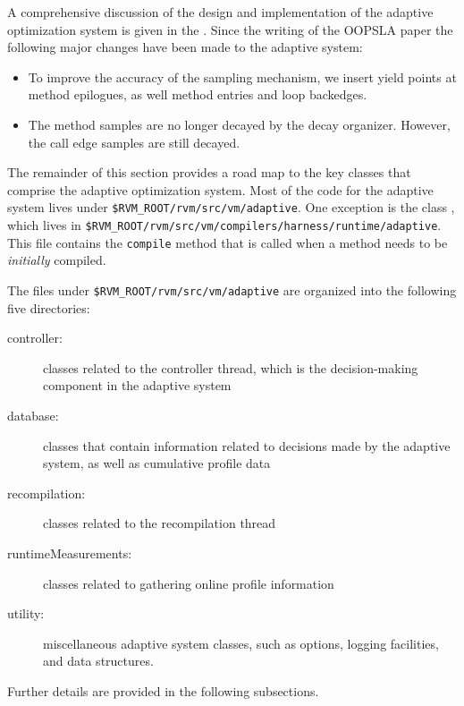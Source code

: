 A comprehensive discussion of the design and implementation of the
adaptive optimization system is given in the
.  
Since the writing of the OOPSLA paper the following major changes
have been made to the adaptive system:
\begin{itemize}
\item To improve the accuracy of the sampling mechanism, we insert
yield points at method epilogues, as well method entries and loop
backedges. 

\item The method samples are no longer decayed by the decay
organizer.  However, the call edge samples are still decayed.

\end{itemize}

The remainder of this section provides a road map to the key
classes that comprise the adaptive optimization system.
Most of the code for the adaptive system lives under
{\tt \$RVM\_ROOT/rvm/src/vm/adaptive}.   One exception is the class
, which lives in
{\tt \$RVM\_ROOT/rvm/src/vm/compilers/harness/runtime/adaptive}.  
This file contains the {\tt compile} method that is called when a
method needs to be {\em initially\/} compiled.  

The files under {\tt \$RVM\_ROOT/rvm/src/vm/adaptive} are organized
into the following five directories:
\begin{description}
\item [controller:] classes related to the controller thread, which is
the decision-making component in the adaptive system

\item [database:] classes that contain information related to decisions
made by the adaptive system, as well as cumulative profile data

\item [recompilation:]  classes related to the recompilation thread

\item [runtimeMeasurements:] classes related to gathering online
profile information

\item [utility:]  miscellaneous adaptive system classes, such as
options, logging facilities, and data structures.
\end{description}
Further details are provided in the following subsections.

